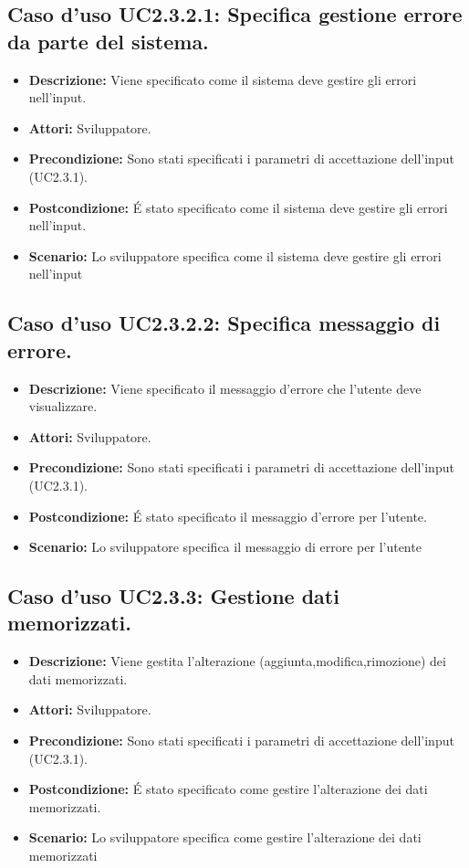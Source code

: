 \subsection{Caso d'uso UC2.3.2.1: Specifica gestione errore da parte del sistema.}
\begin{itemize}
\item[]\textbf{Descrizione:} Viene specificato come il sistema deve gestire gli errori nell'input.
\item[]\textbf{Attori:} Sviluppatore. 
\item[]\textbf{Precondizione:} Sono stati specificati i parametri di accettazione dell'input (UC2.3.1). 
\item[]\textbf{Postcondizione:} \'E stato specificato come il sistema deve gestire gli errori nell'input. 
\item[]\textbf{Scenario:}
Lo sviluppatore specifica come il sistema deve gestire gli errori nell'input 
\end{itemize}

\subsection{Caso d'uso UC2.3.2.2: Specifica messaggio di errore.}
\begin{itemize}
\item[]\textbf{Descrizione:} Viene specificato il messaggio d'errore che l'utente deve visualizzare.
\item[]\textbf{Attori:} Sviluppatore. 
\item[]\textbf{Precondizione:} Sono stati specificati i parametri di accettazione dell'input (UC2.3.1). 
\item[]\textbf{Postcondizione:} \'E stato specificato il messaggio d'errore per l'utente. 
\item[]\textbf{Scenario:}
Lo sviluppatore specifica il messaggio di errore per l'utente 
\end{itemize}

\subsection{Caso d'uso UC2.3.3: Gestione dati memorizzati.}
\begin{itemize}
\item[]\textbf{Descrizione:} Viene gestita l'alterazione (aggiunta,modifica,rimozione) dei dati memorizzati.
\item[]\textbf{Attori:} Sviluppatore. 
\item[]\textbf{Precondizione:} Sono stati specificati i parametri di accettazione dell'input (UC2.3.1). 
\item[]\textbf{Postcondizione:} \'E stato specificato come gestire l'alterazione dei dati memorizzati. 
\item[]\textbf{Scenario:}
Lo sviluppatore specifica come gestire l'alterazione dei dati memorizzati 
\end{itemize}

